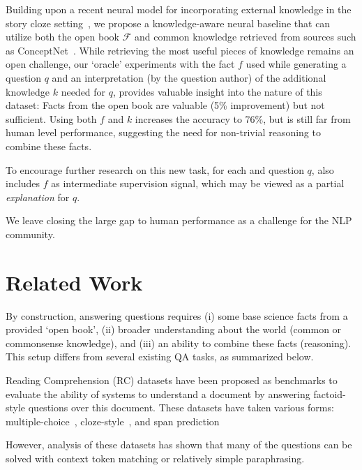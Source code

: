 Building upon a recent neural model for incorporating external knowledge in the story cloze setting~\cite{Mihaylov2018EnhanceCS}, we propose a knowledge-aware neural baseline that can utilize both the open book $\mathcal{F}$ and common knowledge retrieved from sources such as ConceptNet~\cite{Speer2017Conceptnet55}. While retrieving the most useful pieces of knowledge remains an open challenge, our `oracle' experiments with the fact $f$ used while generating a question $q$ and an interpretation (by the question author) of the additional knowledge $k$ needed for $q$, provides valuable insight into the nature of this dataset: Facts from the open book \Fs are valuable (5\% improvement) but not sufficient. Using both $f$ and $k$ increases the accuracy to 76\%, but is still far from human level performance, suggesting the need for non-trivial reasoning to combine these facts.

To encourage further research on this new task, for each \trainname and \devname question $q$, \obqa also includes $f$ as intermediate supervision signal, which may be viewed as a partial \emph{explanation} for $q$.

We leave closing the large gap to human performance as a challenge for the NLP community.

\section{Related Work}
\label{sec:related}

By construction, answering \obqa questions requires (i) some base science facts from a provided `open book', (ii) broader understanding about the world (common or commonsense knowledge), and (iii) an ability to combine these facts (reasoning). This setup differs from several existing QA tasks, as summarized below.

Reading Comprehension (RC) datasets have been proposed as benchmarks to evaluate the ability of systems to understand a document by answering factoid-style questions over this document. These datasets have taken various forms: multiple-choice~\cite{Richardson2013-mctest-dataset}, cloze-style~\cite{Hermann2015-rc-cnn-dm,Onishi2016-rc-whodidwhat,Hill2016-booktest}, and span prediction~\cite{Rajpurkar2016-squad,Trischler2017-rc-newsqa,joshi-EtAl:2017:Trivia-qa}

However, analysis \cite{Chen2016-stanford-reader,Sugawara2016-rc-skills} of these datasets has shown that many of the questions can be solved with context token matching \cite{Chen2016-reading-wikipedia-qa,Weissenborn2016-FastQa} or relatively simple paraphrasing.

